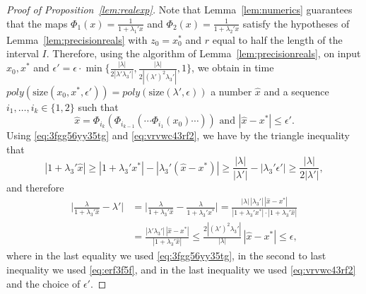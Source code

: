 \documentclass[11pt]{article}
\newcommand{\size}[1]{\mathrm{size}(#1)}
\newcommand{\eps}{\epsilon}
\begin{document}
\begin{proof}[Proof of Proposition~\ref{lem:realexp}]
  Note that Lemma~\ref{lem:numerics} guarantees that the maps $\Phi_1(x)=\frac{1}{1+\lambda_1'x}$ and $\Phi_2(x)=\frac{1}{1+\lambda_2'x}$ satisfy the hypotheses of Lemma~\ref{lem:precisionreals} with $z_0=x_0^*$ and $r$ equal to half the length of the interval $I$. Therefore, using the algorithm of Lemma~\ref{lem:precisionreals}, on input $x_0, x^*$ and $\epsilon'=\epsilon \cdot \min\big\{\frac{|\lambda|}{2|\lambda'\lambda_3'|},\frac{|\lambda|}{2|(\lambda')^2\lambda_3'|},1\big\}$, we obtain in time $poly(\size{x_0,x^*,\eps'})=poly(\size{\lambda',\eps})$ a number $\hat{x}$ and a sequence $i_1,\hdots,i_k\in\{1,2\}$ such that 
\begin{equation}\label{eq:vrvwc43rf2}
\hat{x}=\Phi_{i_k}(\Phi_{i_{k-1}}(\cdots\Phi_{i_1}(x_0)\cdots))\mbox{ and }|\hat{x}-x^*|\leq \epsilon'.
\end{equation}
Using \eqref{eq:3fgg56yy35tg} and \eqref{eq:vrvwc43rf2}, we have by the triangle inequality that 
\begin{equation}\label{eq:erf3f5f}
|1+\lambda_3' \hat{x}|\geq |1+\lambda_3' x^*|-|\lambda_3' (\hat{x}-x^*)|\geq \frac{|\lambda|}{|\lambda'|}-|\lambda_3' \epsilon'|\geq \frac{|\lambda|}{2|\lambda'|} ,
\end{equation} 
and therefore
\begin{equation}\label{eq:4bhb5bb4rfv}
\begin{aligned}
\Big|\frac{\lambda}{1+\lambda_3' \hat{x}}-\lambda'\Big|&=\Big|\frac{\lambda}{1+\lambda_3' \hat{x}}-\frac{\lambda}{1+\lambda_3' x^*}\Big|=  \frac{|\lambda|\,|\lambda_3'|\, |\hat{x}-x^*|}{|1+\lambda_3'x^*|\cdot |1+\lambda_3'\hat{x}|}\\
&=\frac{|\lambda'\lambda_3'|\, |\hat{x}-x^*|}{|1+\lambda_3'\hat{x}|}\leq \frac{2|(\lambda')^2\lambda_3'|}{|\lambda|}\, |\hat{x}-x^*|\leq \epsilon,
\end{aligned}
\end{equation}
where in the last equality we used \eqref{eq:3fgg56yy35tg}, in the second to last inequality we used \eqref{eq:erf3f5f}, and in the last inequality we used \eqref{eq:vrvwc43rf2} and the choice of $\epsilon'$.


\end{proof}
\end{document}
